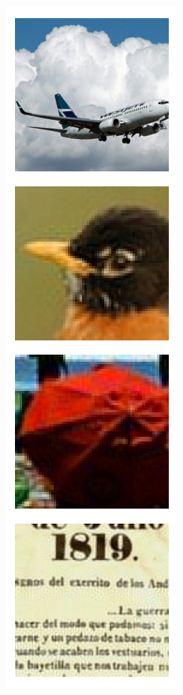 \documentclass{article} %
\begin{document}
\begin{figure}[h]
\begin{subfigure}[t]{0.16\columnwidth}
\label{fig:manipulation-noise}
\end{subfigure}
\begin{subfigure}[t]{0.16\columnwidth}
\includegraphics[width=1\columnwidth]{figures/latents/resample_gaussian.png}\caption{}

\end{subfigure}
\end{figure}
\end{document}
